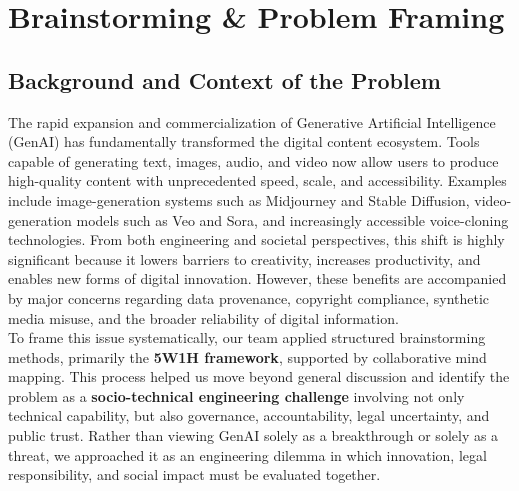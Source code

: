 
\newpage
\section{Brainstorming \& Problem Framing}

\subsection{Background and Context of the Problem}
The rapid expansion and commercialization of Generative Artificial Intelligence (GenAI) has fundamentally transformed the digital content ecosystem. Tools capable of generating text, images, audio, and video now allow users to produce high-quality content with unprecedented speed, scale, and accessibility. Examples include image-generation systems such as Midjourney and Stable Diffusion, video-generation models such as Veo and Sora, and increasingly accessible voice-cloning technologies. From both engineering and societal perspectives, this shift is highly significant because it lowers barriers to creativity, increases productivity, and enables new forms of digital innovation. However, these benefits are accompanied by major concerns regarding data provenance, copyright compliance, synthetic media misuse, and the broader reliability of digital information. \\

To frame this issue systematically, our team applied structured brainstorming methods, primarily the \textbf{5W1H framework}, supported by collaborative mind mapping. This process helped us move beyond general discussion and identify the problem as a \textbf{socio-technical engineering challenge} involving not only technical capability, but also governance, accountability, legal uncertainty, and public trust. Rather than viewing GenAI solely as a breakthrough or solely as a threat, we approached it as an engineering dilemma in which innovation, legal responsibility, and social impact must be evaluated together. \\


